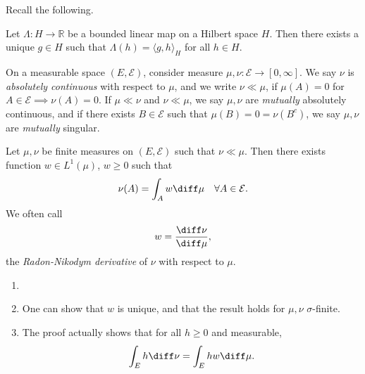 \documentclass[12pt]{article}
\begin{document}

Recall the following.

\begin{theorem}
	Let $\Lambda : H \to \mathbb{R}$ be a bounded linear map on a Hilbert space $H$. Then there exists a unique $g \in H$ such that $\Lambda(h) = \langle g, h \rangle_H$ for all $h \in H$.
\end{theorem}

On a measurable space $(E, \mathcal{E})$, consider measure $\mu, \nu : \mathcal{E} \to [0, \infty]$. We say $\nu$ is \emph{absolutely continuous} with respect to $\mu$, and we write $\nu \ll \mu$, if $\mu(A) = 0$ for $A \in \mathcal{E} \implies \nu(A) = 0$. If $\mu \ll \nu$ and $\nu \ll \mu$, we say $\mu, \nu$ are \emph{mutually} absolutely continuous, and if there exists $B \in \mathcal{E}$ such that $\mu(B) = 0 = \nu(B^{c})$, we say $\mu, \nu$ are \emph{mutually} singular.

\begin{theorem}
	Let $\mu, \nu$ be finite measures on $(E, \mathcal{E})$ such that $\nu \ll \mu$. Then there exists function $w \in L^1(\mu)$, $w \geq 0$ such that
	\[
	\nu(A) = \int_A w \diff \mu \quad \forall A \in \mathcal{E}.
	\]
	We often call
	\[
	w = \frac{\diff \nu}{\diff \mu},
	\]
	the \emph{Radon-Nikodym derivative} of $\nu$ with respect to $\mu$.
\end{theorem}

\begin{remark}
	\begin{enumerate}
		\item[]
		\item One can show that $w$ is unique, and that the result holds for $\mu, \nu$ $\sigma$-finite.
		\item The proof actually shows that for all $h \geq 0$ and measurable,
			\[
			\int_E h \diff \nu = \int_E h w \diff \mu.
			\]
	\end{enumerate}
\end{remark}
\end{document}
